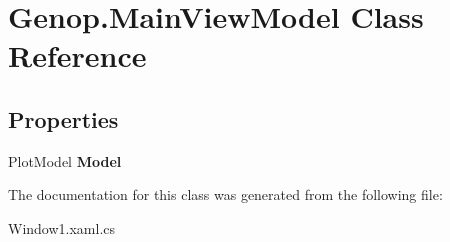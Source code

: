 \hypertarget{classGenop_1_1MainViewModel}{}\section{Genop.\+Main\+View\+Model Class Reference}
\label{classGenop_1_1MainViewModel}
\subsection*{Properties}
\begin{DoxyCompactItemize}
\item 
Plot\+Model {\bfseries Model}\hypertarget{classGenop_1_1MainViewModel_aa9c636994e88a30f28caaee2435b2423}{}\label{classGenop_1_1MainViewModel_aa9c636994e88a30f28caaee2435b2423}

\end{DoxyCompactItemize}


The documentation for this class was generated from the following file\+:\begin{DoxyCompactItemize}
\item 
Window1.\+xaml.\+cs\end{DoxyCompactItemize}
